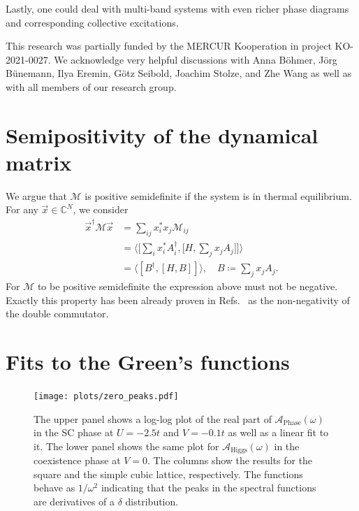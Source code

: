 \documentclass[
    reprint, 
    aps,
    preprintnumbers,
    twocolumn,
    prb,
    superscriptaddress
]{revtex4-2}
\newcommand{\mM}{\mathcal{M}}
\newcommand{\spectral}[1]{\mathcal{A}_\text{#1}  (\omega)}
\newcommand{\bs}{\begin{subequations}}
\newcommand{\es}{\end{subequations}}
\begin{document}
Lastly, one could deal with multi-band systems with even richer phase
diagrams and corresponding collective excitations. 


\begin{acknowledgments} 
	This research was partially funded by the MERCUR Kooperation
		in project KO-2021-0027. We acknowledge very helpful discussions with
		Anna B\"ohmer, J\"org B\"unemann, Ilya Eremin, G\"otz Seibold, Joachim Stolze, and Zhe Wang
		as well as with all members of our research group.
\end{acknowledgments}


\appendix
\section{Semipositivity of the dynamical matrix}
\label{sec:positive_M}

We argue that $\mathcal{M}$ is positive semidefinite if the system is in thermal equilibrium.
For any $\vec{x} \in \mathbb{C}^N$, we consider
\bs
\begin{align}
    \vec{x}^\dagger \mM \vec{x} &= \sum_{ij} x_i^* x_j \mM_{ij} 
		\\
        &= \Big\langle \Big[ \sum_i x_i^* A_i^\dagger, \Big[ H, \sum_j x_j A_j \Big] \Big]  \Big\rangle 
				\\
        &= \langle [B^\dagger, [H, B]] \rangle,\quad B \coloneqq  \sum_j x_j A_j.
\end{align}
\es
For $\mM$ to be positive semidefinite the expression above must not be negative.
Exactly this property has been already proven in Refs.\ \cite{mermin66,Dyson1978}
as the non-negativity of the double commutator.


\section{Fits to the Green's functions}
\label{sec:fit_greens_functions}

\begin{figure}[htb]
    \centering
    \texttt{[image: plots/zero\_peaks.pdf]}
    \caption{The upper panel shows a log-log plot of the real part of $\spectral{Phase}$ 
		in the SC phase at $U=-2.5t$ and $V=-0.1t$ as well as a linear fit to it.
    The lower panel shows the same plot for $\spectral{Higgs}$ in the coexistence phase at $V=0$. 
		The columns show the results for the square and the simple cubic lattice, respectively.
    The functions behave as $1/\omega^2$ indicating that the peaks in the spectral functions are derivatives 
		of a $\delta$ distribution.}
    \label{fig:zero_peaks}
\end{figure}
\end{document}
